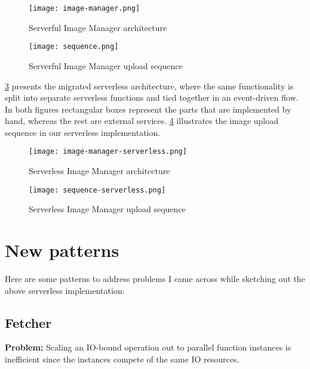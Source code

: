 \begin{figure}[h]
  \centering
  \texttt{[image: image-manager.png]}
  \caption{Serverful Image Manager architecture}
  \label{fig:serverfulArchitecture}
\end{figure}

\begin{figure}[h]
  \centering
  \texttt{[image: sequence.png]}
  \caption{Serverful Image Manager upload sequence}
  \label{fig:serverfulSequence}
\end{figure}

\ref{fig:serverlessArchitecture} presents the migrated serverless architecture, where the same functionality is split into separate serverless functions and tied together in an event-driven flow. In both figures rectangular boxes represent the parts that are implemented by hand, whereas the rest are external services. \ref{fig:serverlessSequence} illustrates the image upload sequence in our serverless implementation.


\begin{figure}[h]
  \centering
  \texttt{[image: image-manager-serverless.png]}
  \caption{Serverless Image Manager architecture}
  \label{fig:serverlessArchitecture}
\end{figure}

\begin{figure}[h]
  \centering
  \texttt{[image: sequence-serverless.png]}
  \caption{Serverless Image Manager upload sequence}
  \label{fig:serverlessSequence}
\end{figure}

\section{New patterns} \label{sec:newPatterns}

Here are some patterns to address problems I came across while sketching out the above serverless implementation:

\subsection{Fetcher} \label{subsec:Fetcher}

\textbf{Problem:} Scaling an IO-bound operation out to parallel function instances is inefficient since the instances compete of the same IO resources.

